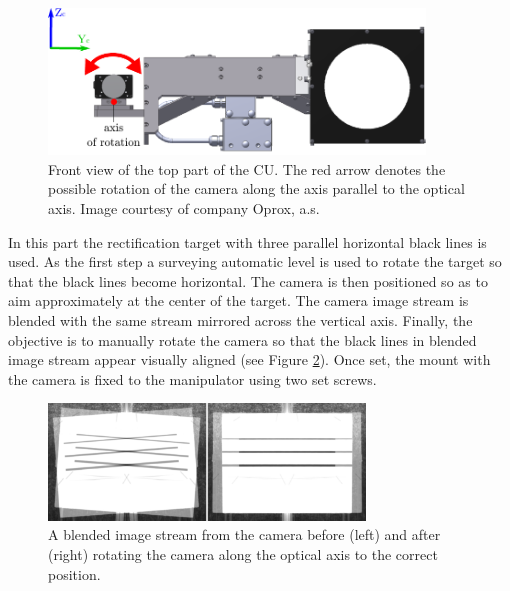 \begin{figure}[htb]
	\centering
	\includegraphics[width=10cm]{fig/rect_model_front_view.pdf}
	\caption{Front view of the top part of the CU. The red arrow denotes the possible rotation of the camera along the axis parallel to the optical axis. Image courtesy of company Oprox, a.s.}
	\label{fig:rect_model_front_view}
\end{figure}

In this part the rectification target with three parallel horizontal black lines is used. As the first step a surveying automatic level is used to rotate the target so that the black lines become horizontal. The camera is then positioned so as to aim approximately at the center of the target. The camera image stream is blended with the same stream mirrored across the vertical axis. Finally, the objective is to manually rotate the camera so that the black lines in blended image stream appear visually aligned (see Figure \ref{fig:rect_mirrored_stream}). Once set, the mount with the camera is fixed to the manipulator using two set screws.

\begin{figure}[htb]
	\centering
	\includegraphics[width=0.75\textwidth]{fig/rect_mirrored_stream.png}
	\caption{A blended image stream from the camera before (left) and after (right) rotating the camera along the optical axis to the correct position.}
	\label{fig:rect_mirrored_stream}
\end{figure}

